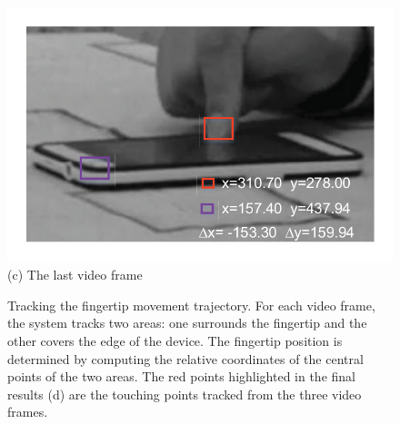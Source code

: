 \begin{figure}[!t]
{\begin{minipage}[t]{0.23\textwidth}
                \includegraphics[width=1\textwidth]{fig/6--3.pdf}\\
                \centering  (c) The last video frame
                \end{minipage}
            }
            \hfill
            \vspace{-3mm}
            \caption{Tracking the fingertip movement trajectory. For each video frame, the system tracks two areas: one surrounds the fingertip and the other covers the edge of the device.
            The fingertip position is determined by computing the relative coordinates of the central points of the two areas.
            The red points highlighted in the final results (d) are the touching points tracked from the three video frames.}
            \label{fig:fig5}
            \vspace{-4mm}
        \end{figure}

